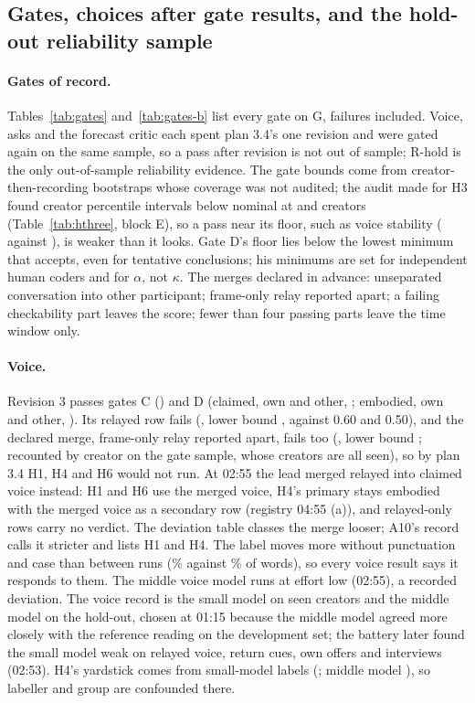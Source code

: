 \subsection{Gates, choices after gate results, and the hold-out reliability sample}
\label{app:gates}

\paragraph{Gates of record.} Tables~\ref{tab:gates} and~\ref{tab:gates-b} list every gate on G, failures included.
Voice, asks and the forecast critic each spent plan 3.4's one revision and were gated again on the same sample, so a
pass after revision is not out of sample; R-hold is the only out-of-sample reliability evidence. The gate bounds come
from creator-then-recording bootstraps whose coverage was not audited; the audit made for H3 found creator percentile
intervals below nominal at \MinCreatorsRegistered{} and \HThreeCreators{} creators (Table~\ref{tab:hthree}, block E),
so a pass near its floor, such as voice stability (\VoiceGateC{} against \VoiceGateCFloor), is weaker than it looks.
Gate D's floor lies below the lowest minimum that \citet{krippendorff2004reliability} accepts, even for tentative
conclusions; his minimums are set for independent human coders and for $\alpha$, not $\kappa$. The merges declared in
advance: unseparated conversation into other participant; frame-only relay reported apart; a failing
checkability part leaves the score; fewer than four passing parts leave the time window only.

\paragraph{Voice.} Revision 3 passes gates C (\VoiceGateC) and D (claimed, own and other, \VoiceGateDKappa; embodied,
own and other, \VoiceGateDEmbodied). Its relayed row fails (\VoiceRelayedKappa, lower bound \VoiceRelayedLower, against
0.60 and 0.50), and the declared merge, frame-only relay reported apart, fails too (\VoiceFrameOnlyKappa, lower bound
\VoiceFrameOnlyLower; recounted by creator on the gate sample, whose creators are all seen), so by plan 3.4 H1, H4 and H6 would not run. At 02:55 the lead merged relayed into claimed voice
instead: H1 and H6 use the merged voice, H4's primary stays embodied with the merged voice as a secondary row (registry
04:55 (a)), and relayed-only rows carry no verdict. The deviation table classes the merge looser; A10's record calls it
stricter and lists H1 and H4. The label moves more without punctuation and case than between runs
(\VoicePunctMovePct\% against \VoiceRunMovePct\% of words), so every voice result says it responds to them. The middle
voice model runs at effort low (02:55), a recorded deviation. The voice record is the small model on seen creators and
the middle model on the hold-out, chosen at 01:15 because the middle model agreed more closely with the reference
reading on the development set; the battery later found the small model weak on relayed voice, return cues, own offers
and interviews (02:53). H4's yardstick comes from small-model labels (\HFourYardstick; middle model
\HFourYardstickMiddle), so labeller and group are confounded there.

